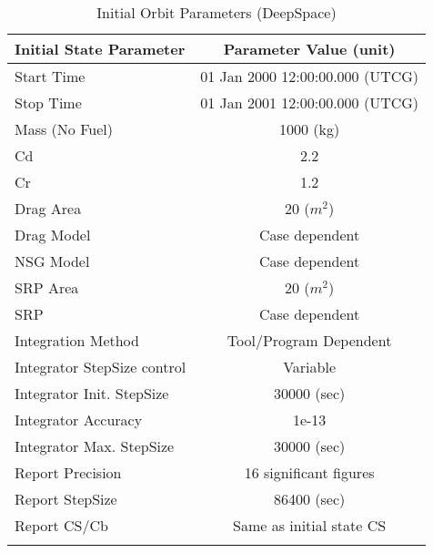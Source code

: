 \begin{table}[htbp!]
\centering \caption{Initial Orbit Parameters
(DeepSpace)}
      \begin{tabular}{lc}
      \hline\hline
            Initial State Parameter & Parameter Value (unit)\\
            \hline
            Start Time & 01 Jan 2000 12:00:00.000 (UTCG)\\
            Stop Time & 01 Jan 2001 12:00:00.000 (UTCG)\\
            
            Mass (No Fuel) & 1000 (kg)\\
            Cd & 2.2\\
            Cr & 1.2\\
            Drag Area & 20 ($m^2$)\\
            Drag Model & Case dependent\\
            NSG Model & Case dependent\\
            SRP Area & 20 ($m^2$)\\
            SRP & Case dependent\\
            Integration Method & Tool/Program Dependent\\
            Integrator StepSize control & Variable\\
            Integrator Init. StepSize & 30000 (sec)\\
            Integrator Accuracy & 1e-13\\
            Integrator Max. StepSize & 30000 (sec)\\
            Report Precision & 16 significant figures\\
            Report StepSize & 86400 (sec)\\
            Report CS/Cb & Same as initial state CS\\
      \hline\hline
      \label{Table: InitStateDeepSpace}
\end{tabular}
\end{table}

